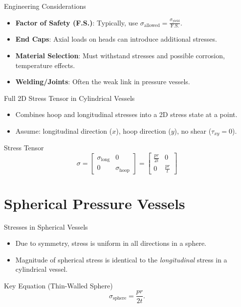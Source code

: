 \documentclass[aspectratio=169]{beamer}
\begin{document}
\begin{frame}{Engineering Considerations}
  \begin{itemize}
    \item \textbf{Factor of Safety (F.S.)}: Typically, use $\sigma_{\text{allowed}} = \frac{\sigma_{\text{yield}}}{\text{F.S.}}$.
    \item \textbf{End Caps}: Axial loads on heads can introduce additional stresses.
    \item \textbf{Material Selection}: Must withstand stresses and possible corrosion, temperature effects.
    \item \textbf{Welding/Joints}: Often the weak link in pressure vessels.
  \end{itemize}
\end{frame}

\begin{frame}{Full 2D Stress Tensor in Cylindrical Vessels}
  \begin{itemize}
    \item Combines hoop and longitudinal stresses into a 2D stress state at a point.
    \item Assume: longitudinal direction ($x$), hoop direction ($y$), no shear ($\tau_{xy} = 0$).
  \end{itemize}
  \vfill
  \begin{block}{Stress Tensor}
    \[
      \sigma = \begin{bmatrix}
        \sigma_{\text{long}} & 0 \\
        0 & \sigma_{\text{hoop}}
      \end{bmatrix}
      = \begin{bmatrix}
        \frac{p r}{2t} & 0 \\
        0 & \frac{p r}{t}
      \end{bmatrix}
    \]
  \end{block}
\end{frame}

\section{Spherical Pressure Vessels}

\begin{frame}{Stresses in Spherical Vessels}
  \begin{itemize}
    \item Due to symmetry, stress is uniform in all directions in a sphere.
    \item Magnitude of spherical stress is identical to the \emph{longitudinal} stress in a cylindrical vessel.
  \end{itemize}
  \vfill
  \begin{block}{Key Equation (Thin-Walled Sphere)}
    \[
      \sigma_{\text{sphere}} = \frac{p r}{2t}.
    \]
  \end{block}
\end{frame}
\end{document}
